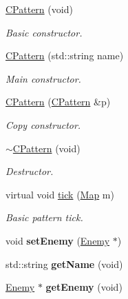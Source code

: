 \begin{DoxyCompactItemize}
\item 
\hyperlink{class_c_pattern_ae12b0c4a7114c39646a247db92ec42f0}{C\+Pattern} (void)
\begin{DoxyCompactList}\small\item\em Basic constructor. \end{DoxyCompactList}\item 
\hyperlink{class_c_pattern_adcff074bdf5884ca2e6c9d1dbb61a442}{C\+Pattern} (std\+::string name)
\begin{DoxyCompactList}\small\item\em Main constructor. \end{DoxyCompactList}\item 
\hyperlink{class_c_pattern_a205b6829b7c209bf098baabf0543426d}{C\+Pattern} (\hyperlink{class_c_pattern}{C\+Pattern} \&p)
\begin{DoxyCompactList}\small\item\em Copy constructor. \end{DoxyCompactList}\item 
\hypertarget{class_c_pattern_abba4a2b9392bacd627cf1ca879f98a26}{\hyperlink{class_c_pattern_abba4a2b9392bacd627cf1ca879f98a26}{$\sim$\+C\+Pattern} (void)}\label{class_c_pattern_abba4a2b9392bacd627cf1ca879f98a26}

\begin{DoxyCompactList}\small\item\em Destructor. \end{DoxyCompactList}\item 
virtual void \hyperlink{class_c_pattern_a8f64aad3b6ebcd606b3c36fc77edf3fd}{tick} (\hyperlink{class_map}{Map} m)
\begin{DoxyCompactList}\small\item\em Basic pattern tick. \end{DoxyCompactList}\item 
\hypertarget{class_c_pattern_a4f24fedd79b39dd721d0517aa715ec74}{void {\bfseries set\+Enemy} (\hyperlink{class_enemy}{Enemy} $\ast$)}\label{class_c_pattern_a4f24fedd79b39dd721d0517aa715ec74}

\item 
\hypertarget{class_c_pattern_a03f821b54e9d88ce3c3d44eb2719012d}{std\+::string {\bfseries get\+Name} (void)}\label{class_c_pattern_a03f821b54e9d88ce3c3d44eb2719012d}

\item 
\hypertarget{class_c_pattern_a3a2b152515f456a8627dd2b82d912e97}{\hyperlink{class_enemy}{Enemy} $\ast$ {\bfseries get\+Enemy} (void)}\label{class_c_pattern_a3a2b152515f456a8627dd2b82d912e97}

\end{DoxyCompactItemize}
